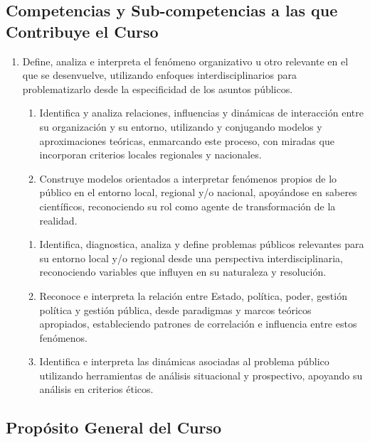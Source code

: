 \documentclass[letterpaper]{article}
\begin{document}
\subsection*{Competencias y Sub-competencias a las que Contribuye el Curso}

\begin{enumerate}
  \item Define, analiza e interpreta el fen\'omeno organizativo u otro relevante en el que se desenvuelve, utilizando enfoques interdisciplinarios para problematizarlo desde la especificidad de los asuntos p\'ublicos.
     \begin{enumerate} 
      \item Identifica y analiza relaciones, influencias y din\'amicas de interacci\'on entre su organizaci\'on y su entorno, utilizando y conjugando modelos y aproximaciones te\'oricas, enmarcando este proceso, con miradas que incorporan criterios locales regionales y nacionales. 
      \item Construye modelos orientados a interpretar fen\'omenos propios de lo p\'ublico en el entorno local, regional y/o nacional, apoy\'andose en saberes cient\'ificos, reconociendo su rol como agente de transformaci\'on de la realidad.
    \end{enumerate}
  
  \begin{enumerate}
    \item Identifica, diagnostica, analiza y define problemas p\'ublicos relevantes para su entorno local y/o regional desde una perspectiva interdisciplinaria, reconociendo variables que influyen en su naturaleza y resoluci\'on. 
    \item Reconoce e interpreta la relaci\'on entre Estado, pol\'itica, poder, gesti\'on pol\'itica y gesti\'on p\'ublica, desde paradigmas y marcos te\'oricos apropiados, estableciendo patrones de correlaci\'on e influencia entre estos fen\'omenos.
    \item Identifica e interpreta las din\'amicas asociadas al problema p\'ublico utilizando herramientas de an\'alisis situacional y prospectivo, apoyando su an\'alisis en criterios \'eticos. 
  \end{enumerate}

\end{enumerate}





\subsection*{Prop\'osito General del Curso}
\end{document}
